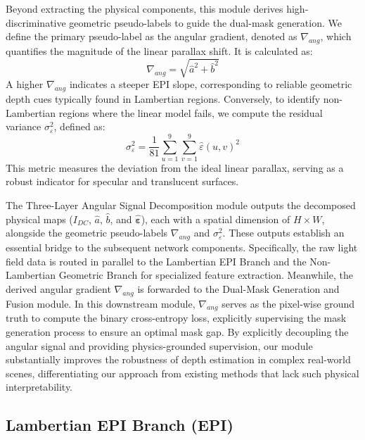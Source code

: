 \documentclass[lettersize,journal]{IEEEtran}
\begin{document}
Beyond extracting the physical components, this module derives high-discriminative geometric pseudo-labels to guide the dual-mask generation. We define the primary pseudo-label as the angular gradient, denoted as $\nabla_{ang}$, which quantifies the magnitude of the linear parallax shift. It is calculated as:
\begin{equation}
\label{eq:eq6}
\nabla_{ang} = \sqrt{\hat{a}^2 + \hat{b}^2}
\end{equation}
A higher $\nabla_{ang}$ indicates a steeper EPI slope, corresponding to reliable geometric depth cues typically found in Lambertian regions. Conversely, to identify non-Lambertian regions where the linear model fails, we compute the residual variance $\sigma_{\varepsilon}^2$, defined as:
\begin{equation}
\label{eq:eq7}
\sigma_{\varepsilon}^2 = \frac{1}{81} \sum_{u=1}^{9} \sum_{v=1}^{9} \hat{\varepsilon}(u,v)^2
\end{equation}
This metric measures the deviation from the ideal linear parallax, serving as a robust indicator for specular and translucent surfaces.

The Three-Layer Angular Signal Decomposition module outputs the decomposed physical maps ($I_{DC}$, $\hat{a}$, $\hat{b}$, and $\hat{\boldsymbol{\varepsilon}}$), each with a spatial dimension of $H \times W$, alongside the geometric pseudo-labels $\nabla_{ang}$ and $\sigma_{\varepsilon}^2$. These outputs establish an essential bridge to the subsequent network components. Specifically, the raw light field data is routed in parallel to the Lambertian EPI Branch and the Non-Lambertian Geometric Branch for specialized feature extraction. Meanwhile, the derived angular gradient $\nabla_{ang}$ is forwarded to the Dual-Mask Generation and Fusion module. In this downstream module, $\nabla_{ang}$ serves as the pixel-wise ground truth to compute the binary cross-entropy loss, explicitly supervising the mask generation process to ensure an optimal mask gap. By explicitly decoupling the angular signal and providing physics-grounded supervision, our module substantially improves the robustness of depth estimation in complex real-world scenes, differentiating our approach from existing methods that lack such physical interpretability.

\subsection{Lambertian EPI Branch (EPI)}
\end{document}
